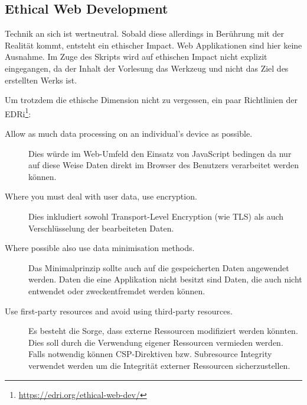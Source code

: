 \subsection{Ethical Web Development}

Technik an sich ist wertneutral. Sobald diese allerdings in Berührung mit der Realität kommt, entsteht ein ethischer Impact. Web Applikationen sind hier keine Ausnahme. Im Zuge des Skripts wird auf ethischen Impact nicht explizit eingegangen, da der Inhalt der Vorlesung das Werkzeug und nicht das Ziel des erstellten Werks ist.

Um trotzdem die ethische Dimension nicht zu vergessen, ein paar Richtlinien der EDRi\footnote{\url{https://edri.org/ethical-web-dev/}}:

\begin{description}
	\item[Allow as much data processing on an individual’s device as possible.] Dies würde im Web-Umfeld den Einsatz von JavaScript bedingen da nur auf diese Weise Daten direkt im Browser des Benutzers verarbeitet werden können.
	\item[Where you must deal with user data, use encryption.] Dies inkludiert sowohl Transport-Level Encryption (wie TLS) als auch Verschlüsselung der bearbeiteten Daten.
	\item[Where possible also use data minimisation methods.] Das Minimalprinzip sollte auch auf die gespeicherten Daten angewendet werden. Daten die eine Applikation nicht besitzt sind Daten, die auch nicht entwendet oder zweckentfremdet werden können.
	\item[Use first-party resources and avoid using third-party resources.] Es besteht die Sorge, dass externe Ressourcen modifiziert werden könnten. Dies soll durch die Verwendung eigener Ressourcen vermieden werden. Falls notwendig können CSP-Direktiven bzw. Subresource Integrity verwendet werden um die Integrität externer Ressourcen sicherzustellen.
\end{description}
